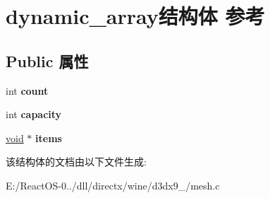 \hypertarget{structdynamic__array}{}\section{dynamic\+\_\+array结构体 参考}
\label{structdynamic__array}
\subsection*{Public 属性}
\begin{DoxyCompactItemize}
\item 
\mbox{\label{structdynamic__array_ab5adcdb3d608726ffa4715e4c5fa4e9a}} 
int {\bfseries count}
\item 
\mbox{\label{structdynamic__array_adffce889dfd3fd30410cf6d63de0e796}} 
int {\bfseries capacity}
\item 
\mbox{\label{structdynamic__array_a13b51b679a3bb64dc97e10839537693b}} 
\hyperlink{interfacevoid}{void} $\ast$ {\bfseries items}
\end{DoxyCompactItemize}


该结构体的文档由以下文件生成\+:\begin{DoxyCompactItemize}
\item 
E\+:/\+React\+O\+S-\/0../dll/directx/wine/d3dx9\+\_/mesh.\+c\end{DoxyCompactItemize}
